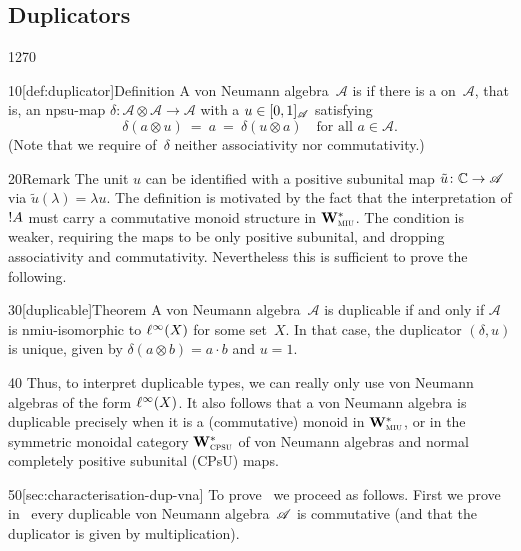 \subsection{Duplicators}
\begin{parsec}{1270}%
\begin{point}{10}[def:duplicator]{Definition}%
A von Neumann algebra~$\mathscr{A}$
is %
if there is a  on~$\mathscr{A}$,%
that is,
an npsu-map
$\delta\colon \mathscr{A}\otimes \mathscr{A}\to\mathscr{A}$
with a  $u\in [0,1]_{\mathscr{A}}$ 
satisfying
\begin{equation*}
\delta(a\otimes u)\ =\ a\ = \ \delta(u\otimes a)
\quad\text{for all~$a\in\mathscr{A}$.}
\end{equation*}
(Note that we require of~$\delta$ neither associativity
nor commutativity.)
\end{point}
\begin{point}{20}{Remark}
The unit $u$ can be identified with
a positive subunital map $\tilde{u}\colon \mathbb{C}\to \mathscr{A}$ via $\tilde{u}(\lambda)=\lambda u$.
The definition is motivated by the fact that the interpretation of $\mathord{!} A$
must carry a commutative monoid structure in $\mathbf{W}^*_{\text{\textsc{miu}}}$.
The condition is weaker, requiring the maps to be only positive subunital,
and dropping associativity and commutativity.
Nevertheless this is sufficient to prove the following.
\end{point}
\begin{point}{30}[duplicable]{Theorem}%
A von Neumann algebra~$\mathscr{A}$
is duplicable if and only if
$\mathscr{A}$ is nmiu-isomorphic to $\ell^\infty(X)$ for some set~$X$.
In that case, the duplicator $(\delta,u)$
is unique, given by
$\delta(a\otimes b) = a\cdot b$ and $u=1$.
\begin{point}{40}%
Thus, to interpret duplicable types,
we can really only use von Neumann algebras of the form $\ell^\infty(X)$.
It also follows that a von Neumann algebra
is duplicable precisely when it is a (commutative) monoid
in $\mathbf{W}^*_{\text{\textsc{miu}}}$, or in the 
symmetric monoidal category $\mathbf{W}^*_{\text{\textsc{cpsu}}}$ of von Neumann algebras
and normal completely positive subunital (CPsU) maps.
\end{point}
\begin{point}{50}[sec:characterisation-dup-vna]%
To prove~
we proceed as follows.
First we prove 
in~
every duplicable von Neumann algebra~$\mathscr{A}$
is commutative (and that the duplicator is given by multiplication).

\end{point}
\end{point}
\end{parsec}

